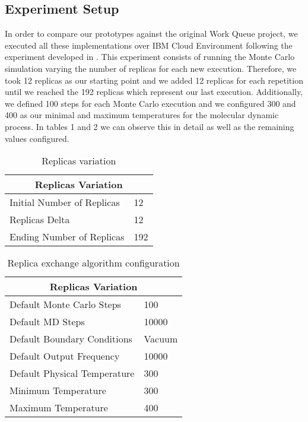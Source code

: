 \documentclass[sigplan, screen]{acmart}
\begin{document}
\subsection{Experiment Setup}
In order to compare our prototypes against the original Work Queue project, we executed all these implementations over IBM Cloud Environment following the  experiment developed in \cite{cloudwq}. This experiment consists of running the Monte Carlo simulation varying the number of replicas for each new execution. Therefore, we took 12 replicas as our starting point and we added 12 replicas for each repetition until we reached the 192 replicas which represent our last execution. Additionally, we defined 100 steps for each Monte Carlo execution and we configured 300 and 400 as our minimal and maximum temperatures for the molecular dynamic process. In tables 1 and 2 we can observe this in detail as well as the remaining values configured.
\begin{table}[h!]
    \centering
    \begin{tabular}{ | l | p{3cm} |}
        \hline
         \multicolumn{2}{|c|}{Replicas Variation} \\
         \hline
         \hline
             Initial Number of Replicas & 12 \\
             Replicas Delta & 12 \\
             Ending Number of Replicas & 192 \\
         \hline
    \end{tabular}
    \caption{Replicas variation}
    \label{table:1}
    \vspace{-9mm}
\end{table}


\begin{table}[h!]
    \centering
    \begin{tabular}{ | l | p{3cm} | }
        \hline
            \multicolumn{2}{|c|}{Replicas Variation} \\
         \hline
         \hline
             Default Monte Carlo Steps & 100 \\
             Default MD Steps & 10000 \\
             Default Boundary Conditions & Vacuum \\
             Default Output Frequency & 10000 \\
             Default Physical Temperature & 300 \\
             Minimum Temperature & 300 \\
             Maximum Temperature & 400 \\
         \hline
    \end{tabular}
    \caption{Replica exchange algorithm configuration}
    \label{table:2}
    \vspace{-4mm}
\end{table}
\end{document}
